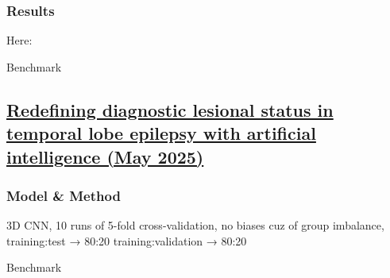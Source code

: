 \subsubsection{Results}

Here: 

\begin{table}[htbp]
	\centering
	\caption{Benchmark}

	\caption{Results from }
	\label{tab:res6}
\end{table}

\subsection{\href{https://academic.oup.com/brain/advance-article/doi/10.1093/brain/awaf020/7972755\#510821169}{Redefining diagnostic lesional status in temporal lobe epilepsy with artificial intelligence (May 2025)}}
\label{sub:sec:3dcnn_article}

\subsubsection{Model \& Method}

3D CNN,
10 runs of 5-fold cross-validation,
no biases cuz of group imbalance,
training:test → 80:20
training:validation → 80:20

\begin{table}[htbp]
	\centering
	\caption{Benchmark}

	\caption{Results}
\end{table}
